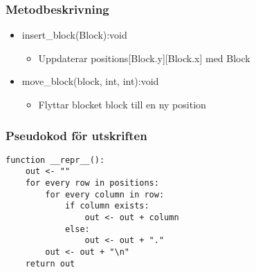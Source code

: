 \documentclass[aspectratio=169]{beamer}
\begin{document}
\begin{frame}
	\frametitle{Metodbeskrivning}
	
	\begin{itemize}
		\item insert\_block(Block):void
		\begin{itemize}
			\item Uppdaterar positions[Block.y][Block.x] med Block 
		\end{itemize}
		\item move\_block(block, int, int):void
		\begin{itemize}
			\item Flyttar blocket block till en ny position
		\end{itemize}
	\end{itemize}
	
\end{frame}

\begin{frame}[fragile]
	\frametitle{Pseudokod för utskriften}
	
	\begin{lstlisting}
function __repr__():
    out <- ""
    for every row in positions:
        for every column in row:
            if column exists:
                out <- out + column
            else:
                out <- out + "."
        out <- out + "\n"
    return out
	\end{lstlisting}
	
\end{frame}
\end{document}
